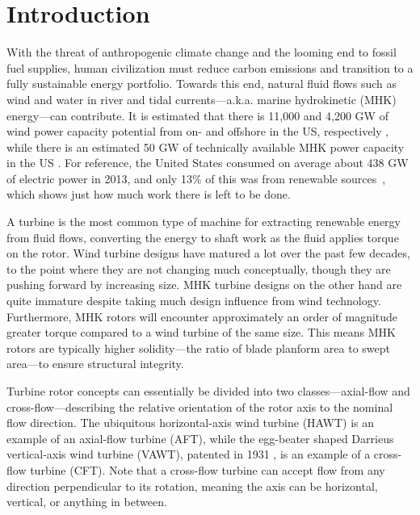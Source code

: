 \chapter{Introduction}

With the threat of anthropogenic climate change and the looming end to fossil
fuel supplies, human civilization must reduce carbon emissions \cite{Hansen2013}
and transition to a fully sustainable energy portfolio. Towards this end,
natural fluid flows such as wind and water in river and tidal currents---a.k.a.
marine hydrokinetic (MHK) energy---can contribute. It is estimated that there is
11,000 and 4,200 GW of wind power capacity potential from on- and offshore in
the US, respectively \cite{Lopez2012}, while there is an estimated 50 GW of
technically available MHK power capacity in the US \cite{Haas2011, Ravens2012,
    Haas2013}. For reference, the United States consumed on average about 438 GW of
electric power in 2013, and only 13\% of this was from renewable
sources~\cite{EIA2015}, which shows just how much work there is left to be done.

A turbine is the most common type of machine for extracting renewable energy
from fluid flows, converting the energy to shaft work as the fluid applies
torque on the rotor. Wind turbine designs have matured a lot over the past few
decades, to the point where they are not changing much conceptually, though they
are pushing forward by increasing size. MHK turbine designs on the other hand
are quite immature despite taking much design influence from wind technology.
Furthermore, MHK rotors will encounter approximately an order of magnitude
greater torque compared to a wind turbine of the same size. This means MHK
rotors are typically higher solidity---the ratio of blade planform area to swept
area---to ensure structural integrity.

Turbine rotor concepts can essentially be divided into two classes---axial-flow
and cross-flow---describing the relative orientation of the rotor axis to the
nominal flow direction. The ubiquitous horizontal-axis wind turbine (HAWT) is an
example of an axial-flow turbine (AFT), while the egg-beater shaped Darrieus
vertical-axis wind turbine (VAWT), patented in 1931 \cite{Darrieus1931}, is an
example of a cross-flow turbine (CFT). Note that a cross-flow turbine can accept
flow from any direction perpendicular to its rotation, meaning the axis can be
horizontal, vertical, or anything in between.

